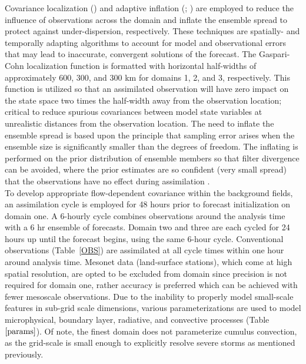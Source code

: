 \documentclass{ttuthes2007}
\newcommand{\tab}{\hspace*{2em}}  %
\begin{document}
\tab Covariance localization (\citealt{Anderson2001}) and adaptive inflation (\citealt{Anderson2007}; \citealt{Anderson2009}) are employed to reduce the influence of observations across the domain and inflate the ensemble  spread to protect against under-dispersion, respectively. These techniques are spatially- and temporally adapting algorithms to account for model and observational errors that may lead to inaccurate, convergent solutions of the forecast. The Gaspari-Cohn localization function \citep{GaspariandCohn1999} is formatted with horizontal half-widths of approximately 600, 300, and 300 km for domains 1, 2, and 3, respectively. This function is utilized so that an assimilated observation will have zero impact on the state space two times the half-width away from the observation location; critical to reduce spurious covariances between model state variables at unrealistic distances from the observation location. The need to inflate the ensemble spread is based upon the principle that sampling error arises when the ensemble size is significantly smaller than the degrees of freedom. The inflating is performed on the prior distribution of ensemble members so that filter divergence can be avoided, where the prior estimates are so confident (very small spread) that the observations have no effect during assimilation \citep{Andersonetal2009}. \\

\tab To develop appropriate flow-dependent covariance within the background fields, an assimilation cycle is employed for 48 hours prior to forecast initialization on domain one. A 6-hourly cycle combines observations around the analysis time with a 6 hr ensemble of forecasts. Domain two and three are each cycled for 24 hours up until the forecast begins, using the same 6-hour cycle. Conventional observations (Table~\ref{OBS}) are assimilated at all cycle times within one hour around analysis time. Mesonet data (land-surface stations), which come at high spatial resolution, are opted to be excluded from domain since precision is not required for domain one, rather accuracy is preferred which can be achieved with fewer mesoscale observations. Due to the inability to properly model small-scale features in sub-grid scale dimensions, various parameterizations are used to model microphysical, boundary layer, radiative, and convective processes (Table $\ref{params}$). Of note, the finest domain does not parameterize cumulus convection, as the grid-scale is small enough to explicitly resolve severe storms \citep{Kainetal2013} as mentioned previously.  \\
\end{document}
